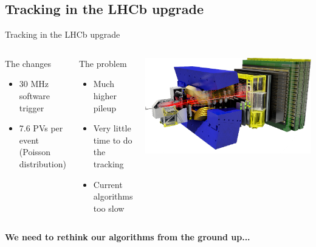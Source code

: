 \subsection{Tracking in the LHCb upgrade}
\begin{frame}{Tracking in the LHCb upgrade}
  \begin{columns}[c]
    \begin{block}{The changes}
      \begin{itemize}
          \item 30 MHz software trigger
          \item 7.6 PVs per event (Poisson distribution)
      \end{itemize}
    \end{block}
    \begin{block}{The problem}
    \begin{itemize}
    	\item Much higher pileup
    	\item Very little time to do the tracking
    	\item Current algorithms too slow
    \end{itemize}
    \end{block}
      \begin{center}
    \includegraphics[width=\textwidth, trim=18 0 18 0]{images/LHCbDet.png}
  \end{center}
  \end{columns}

  \vspace{1em}
  \begin{center}
    \textbf{We need to rethink our algorithms from the ground up...}
  \end{center}
\end{frame}

